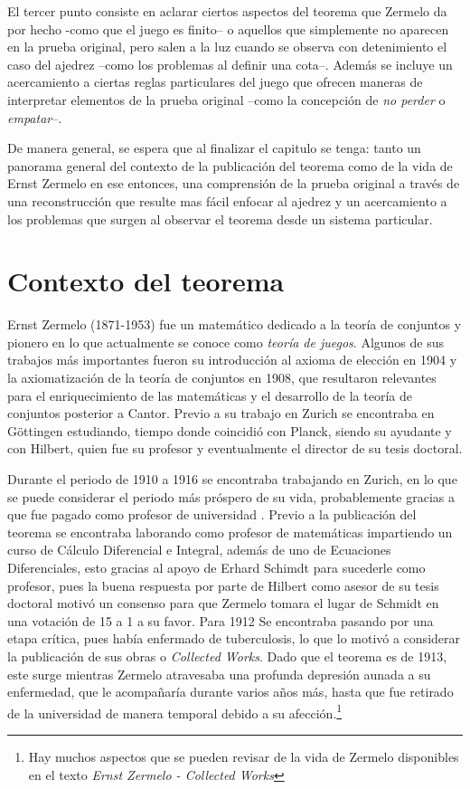 \documentclass[twoside,openright,12pt,a4paper,spanish]{book}
\begin{document}
El tercer punto consiste en aclarar ciertos aspectos del teorema que Zermelo da por hecho -como que el juego es finito-- o aquellos que simplemente no aparecen en la prueba original, pero salen a la luz cuando se observa con detenimiento el caso del ajedrez --como los problemas al definir una cota--. Además se incluye un acercamiento a ciertas reglas particulares del juego que ofrecen maneras de interpretar elementos de la prueba original --como la concepción de \textit{no perder} o \textit{empatar}--.

De manera general, se espera que al finalizar el capitulo se tenga: tanto un panorama general del contexto de la publicación del teorema como de la vida de Ernst Zermelo en ese entonces, una comprensión de la prueba original a través de una reconstrucción que resulte mas fácil enfocar al ajedrez y un acercamiento a los problemas que surgen al observar el teorema desde un sistema particular.

\section{Contexto del teorema}

\noindent Ernst Zermelo (1871-1953) fue un matemático dedicado a la teoría de conjuntos y pionero en lo que actualmente se conoce como \emph{teoría de juegos}. Algunos de sus trabajos más importantes fueron su introducción al axioma de elección en 1904 y la axiomatización de la teoría de conjuntos en 1908, que resultaron relevantes para el enriquecimiento de las matemáticas y el desarrollo de la teoría de conjuntos posterior a Cantor. Previo a su trabajo en Zurich se encontraba en Göttingen estudiando, tiempo donde coincidió con Planck, siendo su ayudante y con Hilbert, quien fue su profesor y eventualmente el director de su tesis doctoral.

Durante el periodo de 1910 a 1916 se encontraba trabajando en Zurich, en lo que se puede considerar el periodo más próspero de su vida, probablemente gracias a que fue pagado como profesor de universidad \cite{zermelo2010ernst}. Previo a la publicación del teorema se encontraba laborando como profesor de matemáticas impartiendo un curso de Cálculo Diferencial e Integral, además de uno de Ecuaciones Diferenciales, esto gracias al apoyo de Erhard Schimdt para sucederle como profesor, pues la buena respuesta por parte de Hilbert como asesor de su tesis doctoral motivó un consenso para que Zermelo tomara el lugar de Schmidt en una votación de 15 a 1 a su favor. Para 1912 Se encontraba pasando por una etapa crítica, pues había enfermado de tuberculosis, lo que lo motivó a considerar la publicación de sus obras o \textit{Collected Works}. Dado que el teorema es de 1913, este surge mientras Zermelo atravesaba una profunda depresión aunada a su enfermedad, que le acompañaría durante varios años más, hasta que fue retirado de la universidad de manera temporal debido a su afección.\footnote{Hay muchos aspectos que se pueden revisar de la vida de Zermelo disponibles en el texto \textit{Ernst Zermelo - Collected Works}}
\end{document}
